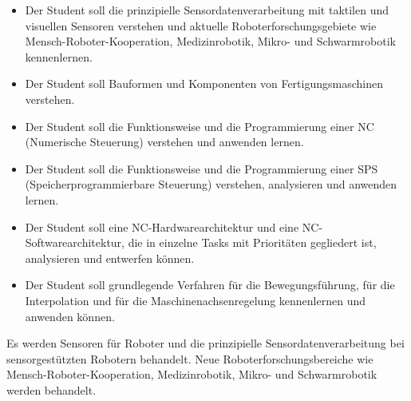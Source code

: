 \begin{module}
\begin{learningoutcomes}
\begin{itemize}\item Der Student soll die prinzipielle Sensordatenverarbeitung mit taktilen und visuellen Sensoren verstehen und aktuelle Roboterforschungsgebiete wie Mensch-Roboter-Kooperation, Medizinrobotik, Mikro- und Schwarmrobotik kennenlernen.  \item Der Student soll Bauformen und Komponenten von Fertigungsmaschinen verstehen.   \item Der Student soll die Funktionsweise und die Programmierung einer NC (Numerische Steuerung) verstehen und anwenden lernen.  \item Der Student soll die Funktionsweise und die Programmierung einer SPS (Speicherprogrammierbare Steuerung) verstehen, analysieren und anwenden lernen.  \item Der Student soll eine NC-Hardwarearchitektur und eine NC-Softwarearchitektur, die in einzelne Tasks mit Prioritäten gegliedert ist, analysieren und entwerfen können.  \item Der Student soll grundlegende Verfahren für die Bewegungsführung, für die Interpolation und für die Maschinenachsenregelung kennenlernen und anwenden können.  \end{itemize}
\end{learningoutcomes}

\begin{content}
Es werden Sensoren für Roboter und die prinzipielle Sensordatenverarbeitung bei sensorgestützten Robotern behandelt. Neue Roboterforschungsbereiche wie Mensch-Roboter-Kooperation, Medizinrobotik, Mikro- und Schwarmrobotik werden behandelt.

 


\end{content}
\end{module}

